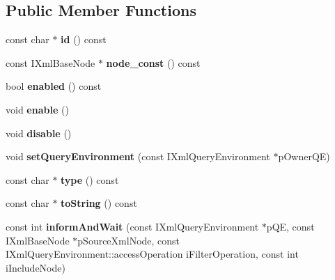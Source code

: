 \subsection*{\-Public \-Member \-Functions}
\begin{DoxyCompactItemize}
\item 
\hypertarget{classgeneral__server_1_1User_a80419aaa7861e95e1adf90deba5e6e7f}{const char $\ast$ {\bfseries id} () const }\label{classgeneral__server_1_1User_a80419aaa7861e95e1adf90deba5e6e7f}

\item 
\hypertarget{classgeneral__server_1_1User_a62a1a6709979938894e064926ed62a9f}{const \-I\-Xml\-Base\-Node $\ast$ {\bfseries node\-\_\-const} () const }\label{classgeneral__server_1_1User_a62a1a6709979938894e064926ed62a9f}

\item 
\hypertarget{classgeneral__server_1_1User_a923de9da34e9df73bcd1df476ea92b50}{bool {\bfseries enabled} () const }\label{classgeneral__server_1_1User_a923de9da34e9df73bcd1df476ea92b50}

\item 
\hypertarget{classgeneral__server_1_1User_a53b302869dc3d2984012d9c38b45f1f1}{void {\bfseries enable} ()}\label{classgeneral__server_1_1User_a53b302869dc3d2984012d9c38b45f1f1}

\item 
\hypertarget{classgeneral__server_1_1User_a62d75c7a666ecb869659bbda8b6bb836}{void {\bfseries disable} ()}\label{classgeneral__server_1_1User_a62d75c7a666ecb869659bbda8b6bb836}

\item 
\hypertarget{classgeneral__server_1_1User_a22a64a97bd4c9086dccf58d3088ec00d}{void {\bfseries set\-Query\-Environment} (const \-I\-Xml\-Query\-Environment $\ast$p\-Owner\-Q\-E)}\label{classgeneral__server_1_1User_a22a64a97bd4c9086dccf58d3088ec00d}

\item 
\hypertarget{classgeneral__server_1_1User_a3cf21693919bec10af2d98de63a942b3}{const char $\ast$ {\bfseries type} () const }\label{classgeneral__server_1_1User_a3cf21693919bec10af2d98de63a942b3}

\item 
\hypertarget{classgeneral__server_1_1User_ab53411113142d3b3b6dd134d4b4007ff}{const char $\ast$ {\bfseries to\-String} () const }\label{classgeneral__server_1_1User_ab53411113142d3b3b6dd134d4b4007ff}

\item 
\hypertarget{classgeneral__server_1_1User_a3ddbcb6b0dcb8c1a7d0374071ef1b4eb}{const int {\bfseries inform\-And\-Wait} (const \-I\-Xml\-Query\-Environment $\ast$p\-Q\-E, const \-I\-Xml\-Base\-Node $\ast$p\-Source\-Xml\-Node, const \-I\-Xml\-Query\-Environment\-::access\-Operation i\-Filter\-Operation, const int i\-Include\-Node)}\label{classgeneral__server_1_1User_a3ddbcb6b0dcb8c1a7d0374071ef1b4eb}


\end{DoxyCompactItemize}
